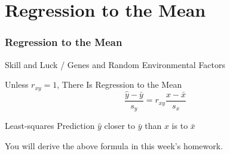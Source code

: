 \section{Regression to the Mean}
\begin{frame}
\frametitle{Regression to the Mean}

\begin{block}{Skill and Luck / Genes and Random Environmental Factors}\end{block}


\begin{block}{Unless $r_{xy}=1$, There Is Regression to the Mean}
$$\frac{\hat{y} - \bar{y}}{{s_y}} = r_{xy} \frac{x - \bar{x}}{s_x}$$
\end{block}

\begin{alertblock}{Least-squares Prediction $\hat{y}$ closer to $\bar{y}$ than $x$ is to $\bar{x}$}
\end{alertblock}
You will derive the above formula in this week's homework.
\end{frame}
%
%
%
%
